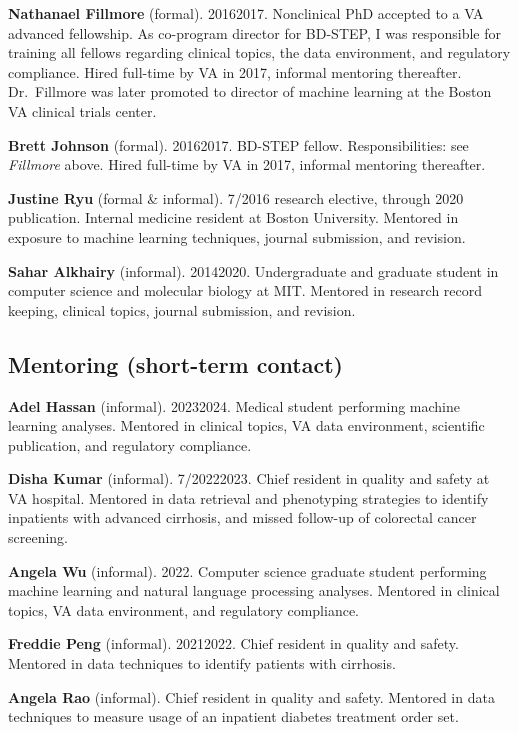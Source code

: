 \documentclass[10pt]{article}
\begin{document}
\textbf{Nathanael Fillmore} (formal). 2016\ndash{}2017.
Nonclinical PhD accepted to a VA advanced fellowship. As co-program
director for BD-STEP, I was responsible for training all fellows
regarding clinical topics, the data environment, and regulatory
compliance. Hired full-time by VA in 2017, informal mentoring
thereafter. Dr.\ Fillmore was later promoted to director of machine
learning at the Boston VA clinical trials center.

\textbf{Brett Johnson} (formal). 2016\ndash{}2017. BD-STEP
fellow. Responsibilities: see \emph{Fillmore} above. Hired full-time
by VA in 2017, informal mentoring thereafter.

\textbf{Justine Ryu} (formal \& informal). 7/2016 research elective,
through 2020 publication. Internal medicine resident at Boston
University. Mentored in exposure to machine learning techniques,
journal submission, and revision.

\textbf{Sahar Alkhairy} (informal). 2014\ndash{}2020. Undergraduate
and graduate student in computer science and molecular biology at MIT.
Mentored in research record keeping, clinical topics, journal
submission, and revision.

\subsection{Mentoring (short-term contact)}


\textbf{Adel Hassan} (informal). 2023\ndash{}2024. Medical student
performing machine learning analyses. Mentored in clinical topics, VA
data environment, scientific publication, and regulatory compliance.

\textbf{Disha Kumar} (informal). 7/2022\ndash{}2023. Chief resident
in quality and safety at VA hospital. Mentored in data retrieval and
phenotyping strategies to identify inpatients with advanced cirrhosis,
and missed follow-up of colorectal cancer screening.

\textbf{Angela Wu} (informal). 2022. Computer science graduate student
performing machine learning and natural language processing analyses.
Mentored in clinical topics, VA data environment, and regulatory
compliance.

\textbf{Freddie Peng} (informal). 2021\ndash{}2022. Chief resident in
quality and safety. Mentored in data techniques to identify patients
with cirrhosis.

\textbf{Angela Rao} (informal). Chief resident in quality and safety.
Mentored in data techniques to measure usage of an inpatient diabetes
treatment order set.
\end{document}
